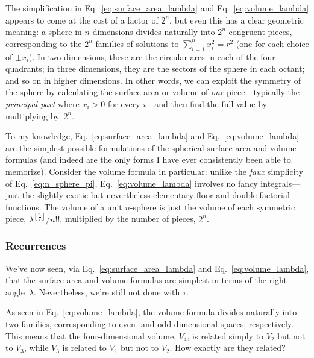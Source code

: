 {The simplification in Eq.~\eqref{eq:surface_area_lambda} and Eq.~\eqref{eq:volume_lambda} appears to come at the cost of a factor of $2^n$, but even this has a clear geometric meaning: a sphere in $n$ dimensions divides naturally into $2^n$ congruent pieces, corresponding to the $2^n$ families of solutions to $\sum_{i=1}^{n} x_i^2 = r^2$ (one for each choice of $\pm x_i$). In two dimensions, these are the circular arcs in each of the four quadrants; in three dimensions, they are the sectors of the sphere in each octant; and so on in higher dimensions. In other words, we can exploit the symmetry of the sphere by calculating the surface area or volume of \emph{one} piece---typically the \emph{principal part} where $x_i > 0$ for every $i$---and then find the full value by multiplying by~$2^n$.

To my knowledge, Eq.~\eqref{eq:surface_area_lambda} and Eq.~\eqref{eq:volume_lambda} are the simplest possible formulations of the spherical surface area and volume formulas (and indeed are the only forms I have ever consistently been able to memorize). Consider the volume formula in particular: unlike the \emph{faux} simplicity of Eq.~\eqref{eq:n_sphere_pi}, Eq.~\eqref{eq:volume_lambda} involves no fancy integrals---just the slightly exotic but nevertheless elementary floor and double-factorial functions. The volume of a unit $n$-sphere is just the volume of each symmetric piece, $\lambda^{\left\lfloor \frac{n}{2} \right\rfloor}/n!!$, multiplied by the number of pieces, $2^n$.


\subsubsection{Recurrences} %
\label{sec:recurrences}

We've now seen, via Eq.~\eqref{eq:surface_area_lambda} and Eq.~\eqref{eq:volume_lambda}, that the surface area and volume formulas are simplest in terms of the right angle~$\lambda$. Nevertheless, we're still not done with $\tau$.

As seen in Eq.~\eqref{eq:volume_lambda}, the volume formula divides naturally into two families, corresponding to even- and odd-dimensional spaces, respectively. This means that the four-dimensional volume, $V_4$, is related simply to $V_2$ but not to $V_3$, while $V_3$ is related to $V_1$ but not to $V_2$. How exactly are they related?

}
